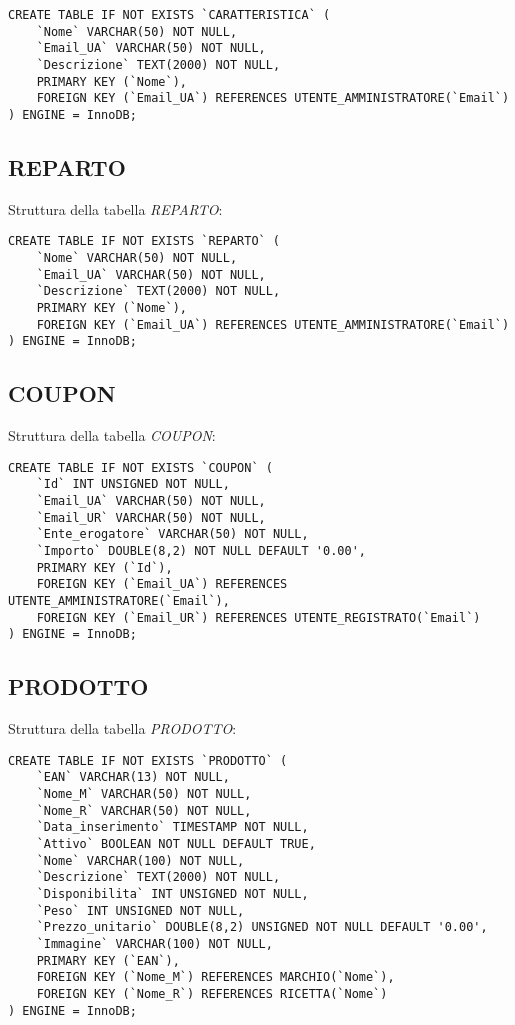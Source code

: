 \begin{lstlisting}
CREATE TABLE IF NOT EXISTS `CARATTERISTICA` (
	`Nome` VARCHAR(50) NOT NULL,
	`Email_UA` VARCHAR(50) NOT NULL,
	`Descrizione` TEXT(2000) NOT NULL,
	PRIMARY KEY (`Nome`),
	FOREIGN KEY (`Email_UA`) REFERENCES UTENTE_AMMINISTRATORE(`Email`)
) ENGINE = InnoDB;
\end{lstlisting}

\subsection{REPARTO}
Struttura della tabella \emph{REPARTO}:

\begin{lstlisting}
CREATE TABLE IF NOT EXISTS `REPARTO` (
	`Nome` VARCHAR(50) NOT NULL,
	`Email_UA` VARCHAR(50) NOT NULL,
	`Descrizione` TEXT(2000) NOT NULL,
	PRIMARY KEY (`Nome`),
	FOREIGN KEY (`Email_UA`) REFERENCES UTENTE_AMMINISTRATORE(`Email`)
) ENGINE = InnoDB;
\end{lstlisting}

\newpage

\subsection{COUPON}
Struttura della tabella \emph{COUPON}:

\begin{lstlisting}
CREATE TABLE IF NOT EXISTS `COUPON` (
	`Id` INT UNSIGNED NOT NULL,	
	`Email_UA` VARCHAR(50) NOT NULL,
	`Email_UR` VARCHAR(50) NOT NULL,
	`Ente_erogatore` VARCHAR(50) NOT NULL,
	`Importo` DOUBLE(8,2) NOT NULL DEFAULT '0.00',
	PRIMARY KEY (`Id`),
	FOREIGN KEY (`Email_UA`) REFERENCES UTENTE_AMMINISTRATORE(`Email`),
	FOREIGN KEY (`Email_UR`) REFERENCES UTENTE_REGISTRATO(`Email`)
) ENGINE = InnoDB;
\end{lstlisting}

\subsection{PRODOTTO}
Struttura della tabella \emph{PRODOTTO}:

\begin{lstlisting}
CREATE TABLE IF NOT EXISTS `PRODOTTO` (
	`EAN` VARCHAR(13) NOT NULL,
	`Nome_M` VARCHAR(50) NOT NULL,
	`Nome_R` VARCHAR(50) NOT NULL,
	`Data_inserimento` TIMESTAMP NOT NULL,
	`Attivo` BOOLEAN NOT NULL DEFAULT TRUE,
	`Nome` VARCHAR(100) NOT NULL,
	`Descrizione` TEXT(2000) NOT NULL,
	`Disponibilita` INT UNSIGNED NOT NULL,
	`Peso` INT UNSIGNED NOT NULL,
	`Prezzo_unitario` DOUBLE(8,2) UNSIGNED NOT NULL DEFAULT '0.00',
	`Immagine` VARCHAR(100) NOT NULL,
	PRIMARY KEY (`EAN`),
	FOREIGN KEY (`Nome_M`) REFERENCES MARCHIO(`Nome`),
	FOREIGN KEY (`Nome_R`) REFERENCES RICETTA(`Nome`)
) ENGINE = InnoDB;
\end{lstlisting}

